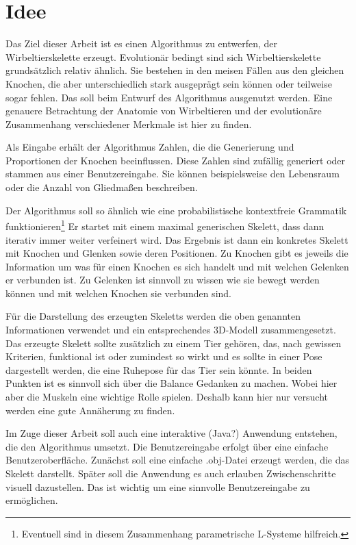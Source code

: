 
\chapter{Idee}

Das Ziel dieser Arbeit ist es einen Algorithmus zu entwerfen, der Wirbeltierskelette erzeugt. Evolutionär bedingt sind sich Wirbeltierskelette grundsätzlich relativ ähnlich. Sie bestehen in den meisen Fällen aus den gleichen Knochen, die aber unterschiedlich stark ausgeprägt sein können oder teilweise sogar fehlen. Das soll beim Entwurf des Algorithmus ausgenutzt werden. Eine genauere Betrachtung der Anatomie von Wirbeltieren und der evolutionäre Zusammenhang verschiedener Merkmale ist \zb hier \cite{Vergleichende_Anatomie} zu finden. 

Als Eingabe erhält der Algorithmus Zahlen, die die Generierung und Proportionen der Knochen beeinflussen. Diese Zahlen sind zufällig generiert oder stammen aus einer Benutzereingabe. Sie können beispielsweise den Lebensraum oder die Anzahl von Gliedmaßen beschreiben.

Der Algorithmus soll so ähnlich wie eine probabilistische kontextfreie Grammatik funktionieren\footnote{Eventuell sind in diesem Zusammenhang parametrische L-Systeme \cite{Paramteric_L-Systems} hilfreich.} Er startet mit einem maximal generischen Skelett, dass dann iterativ immer weiter verfeinert wird. Das Ergebnis ist dann ein konkretes Skelett mit Knochen und Glenken sowie deren Positionen. Zu Knochen gibt es jeweils die Information um was für einen Knochen es sich handelt und mit welchen Gelenken er verbunden ist. Zu Gelenken ist sinnvoll zu wissen wie sie bewegt werden können und mit welchen Knochen sie verbunden sind.

Für die Darstellung des erzeugten Skeletts werden die oben genannten Informationen verwendet und ein entsprechendes 3D-Modell zusammengesetzt.
Das erzeugte Skelett sollte zusätzlich zu einem Tier gehören, das, nach gewissen Kriterien, funktional ist oder zumindest so wirkt und es sollte in einer Pose dargestellt werden, die eine Ruhepose für das Tier sein könnte. In beiden Punkten ist es sinnvoll sich über die Balance Gedanken zu machen. Wobei hier aber die Muskeln eine wichtige Rolle spielen. Deshalb kann hier nur versucht werden eine gute Annäherung zu finden.

Im Zuge dieser Arbeit soll auch eine interaktive (Java?) Anwendung entstehen, die den Algorithmus umsetzt. Die Benutzereingabe erfolgt über eine einfache Benutzeroberfläche. Zunächst soll eine einfache .obj-Datei erzeugt werden, die das Skelett darstellt. Später soll die Anwendung es auch erlauben Zwischenschritte visuell dazustellen. Das ist wichtig um eine sinnvolle Benutzereingabe zu ermöglichen.

